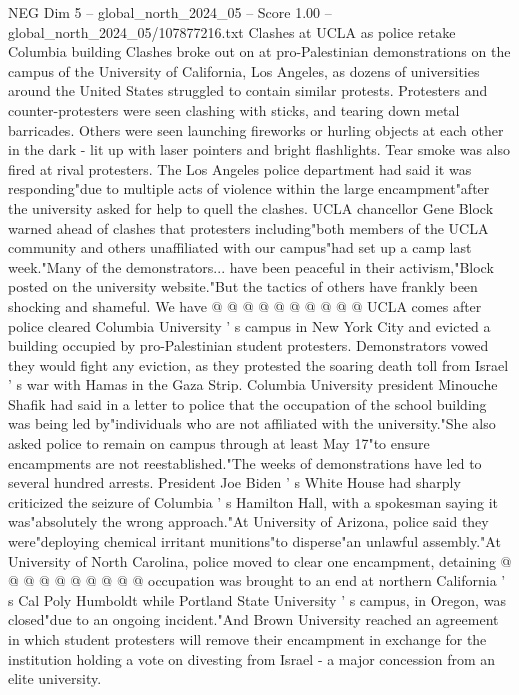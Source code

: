 \begin{textsample}{NEG Dim 5 – global\_north\_2024\_05 – Score 1.00 – global\_north\_2024\_05/107877216.txt}  \label{ex:f5_neg_286}
Clashes at UCLA as police retake Columbia building Clashes broke out on at pro-Palestinian demonstrations on the campus of the University of California, Los Angeles, as dozens of universities around the United States struggled to contain similar protests.
Protesters and counter-protesters were seen clashing with sticks, and tearing down metal barricades.
Others were seen launching fireworks or hurling objects at each other in the dark - lit up with laser pointers and bright flashlights.
Tear smoke was also fired at rival protesters.
The Los Angeles police department had said it was responding"due to multiple acts of violence within the large encampment"after the university asked for help to quell the clashes.
UCLA chancellor Gene Block warned ahead of clashes that protesters including"both members of the UCLA community and others unaffiliated with our campus"had set up a camp last week."Many of the demonstrators... have been peaceful in their activism,"Block posted on the university website."But the tactics of others have frankly been shocking and shameful.
We have @ @ @ @ @ @ @ @ @ @ UCLA comes after police cleared Columbia University ' s campus in New York City and evicted a building occupied by pro-Palestinian student protesters.
Demonstrators vowed they would fight any eviction, as they protested the soaring death toll from Israel ' s war with Hamas in the Gaza Strip.
Columbia University president Minouche Shafik had said in a letter to police that the occupation of the school building was being led by"individuals who are not affiliated with the university."She also asked police to remain on campus through at least May 17"to ensure encampments are not reestablished."The weeks of demonstrations have led to several hundred arrests.
President Joe Biden ' s White House had sharply criticized the seizure of Columbia ' s Hamilton Hall, with a spokesman saying it was"absolutely the wrong approach."At University of Arizona, police said they were"deploying chemical irritant munitions"to disperse"an unlawful assembly."At University of North Carolina, police moved to clear one encampment, detaining @ @ @ @ @ @ @ @ @ @ occupation was brought to an end at northern California ' s Cal Poly Humboldt while Portland State University ' s campus, in Oregon, was closed"due to an ongoing incident."And Brown University reached an agreement in which student protesters will remove their encampment in exchange for the institution holding a vote on divesting from Israel - a major concession from an elite university.

\end{textsample}
